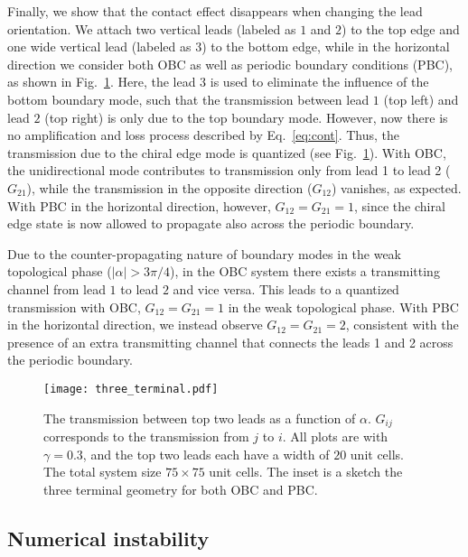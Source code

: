 \documentclass[aps,pra,reprint,superscriptaddress,showkeys,amsmath,amssymb,longbibliography]{revtex4-1}
\begin{document}
Finally, we show that the contact effect disappears when changing the lead orientation. 
We attach two vertical leads (labeled as $1$ and $2$) to the top edge and one wide vertical lead (labeled as $3$) to the bottom edge, while in the horizontal direction we consider both OBC as well as periodic boundary conditions (PBC), as shown in Fig.~\ref{fig: three_terminal}.
Here, the lead $3$ is used to eliminate the influence of the bottom boundary mode, such that the transmission between lead $1$ (top left) and lead $2$ (top right) is only due to the top boundary mode.
However, now there is no amplification and loss process described by Eq.\ \eqref{eq:cont}.
Thus, the transmission due to the chiral edge mode is quantized (see Fig.~\ref{fig: three_terminal}). 
With OBC, the unidirectional mode contributes to transmission only from lead 1 to lead 2 ($G_{21}$), while the transmission in the opposite direction ($G_{12}$) vanishes, as expected. 
With PBC in the horizontal direction, however, $G_{12}=G_{21}=1$, since the chiral edge state is now allowed to propagate also across the periodic boundary.

Due to the counter-propagating nature of boundary modes in the weak topological phase ($|\alpha|>3\pi/4$), in the OBC system there exists a transmitting channel from lead $1$ to lead $2$ and vice versa. 
This leads to a quantized transmission with OBC,  $G_{12}=G_{21}=1$ in the weak topological phase.
With PBC in the horizontal direction, we instead observe $G_{12}=G_{21}=2$, consistent with the presence of an extra transmitting channel that connects the leads 1 and 2 across the periodic boundary.

\begin{figure}
\centering
\texttt{[image: three\_terminal.pdf]}
\caption{The transmission between top two leads as a function of $\alpha$. $G_{ij}$ corresponds to the transmission from $j$ to $i$. 
All plots are with $\gamma=0.3$, and the top two leads each have a width of $20$ unit cells. 
The total system size $75\times 75$ unit cells. 
The inset is a sketch the three terminal geometry for both OBC and PBC.
\label{fig: three_terminal}}
\end{figure}

\subsection{Numerical instability}
\label{sec:ni}
\end{document}
